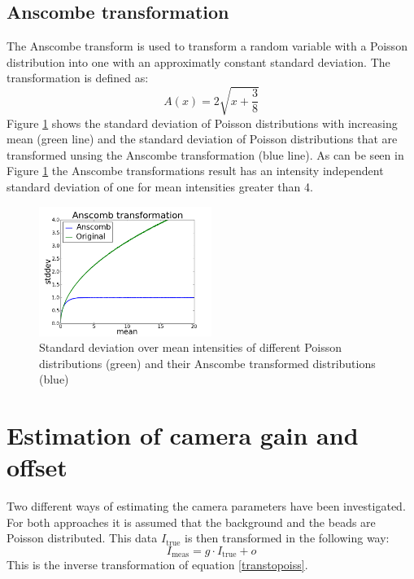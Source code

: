 \subsection{Anscombe transformation}
\label{trafoAnscombe}
The Anscombe transform \cite{anscombe} is used to transform a random variable with a Poisson
distribution into one with an approximatly constant standard deviation. The
transformation is defined as:
\begin{equation}
	A(x) = 2\sqrt{x+\frac{3}{8}}
\end{equation}
Figure \ref{anscombe} shows the standard deviation of Poisson distributions with increasing mean (green line) and the standard deviation of Poisson distributions that are transformed unsing the Anscombe transformation (blue line). As can be seen in Figure \ref{anscombe} the Anscombe transformations result has
an intensity independent standard deviation of one for mean intensities greater than 4.
\begin{figure}
	\centering
	\includegraphics[width = 0.5\textwidth]{pictures/anscombe.png}
	\caption{Standard deviation over mean intensities of different Poisson
	distributions (green) and their Anscombe transformed distributions (blue)}
	\label{anscombe}	
\end{figure}
 

\section{Estimation of camera gain and offset}\label{estimationCameraGain}
Two different ways of estimating the camera parameters have been investigated. For both approaches it is assumed that the background and the beads are Poisson distributed. This data $I_\text{true}$ is then transformed in the following way:
\begin{equation}
	I_\text{meas} = g \cdot I_\text{true} + o \label{trafoGain}
\end{equation}
This is the inverse transformation of equation \ref{transtopoiss}.
